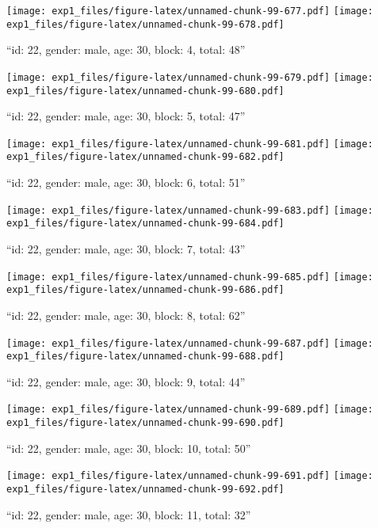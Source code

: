 \documentclass[,]{article}
\begin{document}
\texttt{[image: exp1\_files/figure-latex/unnamed-chunk-99-677.pdf]}
\texttt{[image: exp1\_files/figure-latex/unnamed-chunk-99-678.pdf]}

\newpage
[1] 

``id: 22, gender: male, age: 30, block: 4, total: 48''

\texttt{[image: exp1\_files/figure-latex/unnamed-chunk-99-679.pdf]}
\texttt{[image: exp1\_files/figure-latex/unnamed-chunk-99-680.pdf]}

\newpage
[1] 

``id: 22, gender: male, age: 30, block: 5, total: 47''

\texttt{[image: exp1\_files/figure-latex/unnamed-chunk-99-681.pdf]}
\texttt{[image: exp1\_files/figure-latex/unnamed-chunk-99-682.pdf]}

\newpage
[1] 

``id: 22, gender: male, age: 30, block: 6, total: 51''

\texttt{[image: exp1\_files/figure-latex/unnamed-chunk-99-683.pdf]}
\texttt{[image: exp1\_files/figure-latex/unnamed-chunk-99-684.pdf]}

\newpage
[1] 

``id: 22, gender: male, age: 30, block: 7, total: 43''

\texttt{[image: exp1\_files/figure-latex/unnamed-chunk-99-685.pdf]}
\texttt{[image: exp1\_files/figure-latex/unnamed-chunk-99-686.pdf]}

\newpage
[1] 

``id: 22, gender: male, age: 30, block: 8, total: 62''

\texttt{[image: exp1\_files/figure-latex/unnamed-chunk-99-687.pdf]}
\texttt{[image: exp1\_files/figure-latex/unnamed-chunk-99-688.pdf]}

\newpage
[1] 

``id: 22, gender: male, age: 30, block: 9, total: 44''

\texttt{[image: exp1\_files/figure-latex/unnamed-chunk-99-689.pdf]}
\texttt{[image: exp1\_files/figure-latex/unnamed-chunk-99-690.pdf]}

\newpage
[1] 

``id: 22, gender: male, age: 30, block: 10, total: 50''

\texttt{[image: exp1\_files/figure-latex/unnamed-chunk-99-691.pdf]}
\texttt{[image: exp1\_files/figure-latex/unnamed-chunk-99-692.pdf]}

\newpage
[1] 

``id: 22, gender: male, age: 30, block: 11, total: 32''
\end{document}
